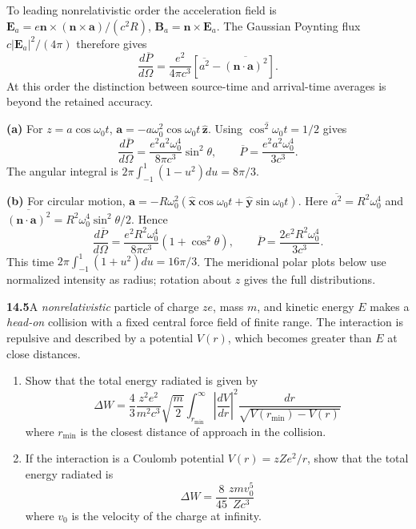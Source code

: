 To leading nonrelativistic order the acceleration field is
$\mathbf E_a=e\mathbf n\times(\mathbf n\times\mathbf a)/(c^2R)$,
$\mathbf B_a=\mathbf n\times\mathbf E_a$. The Gaussian Poynting flux
$c|\mathbf E_a|^2/(4\pi)$ therefore gives
\[
\frac{d\overline P}{d\Omega}
=\frac{e^2}{4\pi c^3}
\left[\overline{a^2}-\overline{(\mathbf n\cdot\mathbf a)^2}\right].
\]
At this order the distinction between source-time and arrival-time
averages is beyond the retained accuracy.

\textbf{(a)} For $z=a\cos\omega_0t$,
$\mathbf a=-a\omega_0^2\cos\omega_0t\,\hat{\mathbf z}$.
Using $\overline{\cos^2\omega_0t}=1/2$ gives
\[
\boxed{\frac{d\overline P}{d\Omega}
=\frac{e^2a^2\omega_0^4}{8\pi c^3}\sin^2\theta,
\qquad \overline P=\frac{e^2a^2\omega_0^4}{3c^3}.}
\]
The angular integral is $2\pi\int_{-1}^1(1-u^2)du=8\pi/3$.

\textbf{(b)} For circular motion,
$\mathbf a=-R\omega_0^2(\hat{\mathbf x}\cos\omega_0t+
\hat{\mathbf y}\sin\omega_0t)$.
Here $\overline{a^2}=R^2\omega_0^4$ and
$\overline{(\mathbf n\cdot\mathbf a)^2}=
R^2\omega_0^4\sin^2\theta/2$. Hence
\[
\boxed{\frac{d\overline P}{d\Omega}
=\frac{e^2R^2\omega_0^4}{8\pi c^3}(1+\cos^2\theta),
\qquad \overline P=\frac{2e^2R^2\omega_0^4}{3c^3}.}
\]
This time $2\pi\int_{-1}^1(1+u^2)du=16\pi/3$.
The meridional polar plots below use normalized intensity as radius;
rotation about $z$ gives the full distributions.
\begin{center}\end{center}

\par\bigskip
\noindent\textbf{14.5}\quad A \emph{nonrelativistic} particle of charge $ze$, mass $m$, and kinetic energy $E$ makes a \emph{head-on} collision with a fixed central force field of finite range. The interaction is repulsive and described by a potential $V(r)$, which becomes greater than $E$ at close distances.
\begin{enumerate}
\item[(a)] Show that the total energy radiated is given by
\[
\Delta W=\frac{4}{3}\frac{z^{2}e^{2}}{m^{2}c^{3}}\sqrt{\frac{m}{2}}\int_{r_{\min}}^{\infty}\left|\frac{dV}{dr}\right|^{2}\frac{dr}{\sqrt{V(r_{\min})-V(r)}}
\]
where $r_{\min}$ is the closest distance of approach in the collision.
\item[(b)] If the interaction is a Coulomb potential $V(r)=zZe^{2}/r$, show that the total energy radiated is
\[
\Delta W=\frac{8}{45}\frac{zmv_{0}^{5}}{Zc^{3}}
\]
where $v_{0}$ is the velocity of the charge at infinity.
\end{enumerate}
\solution

